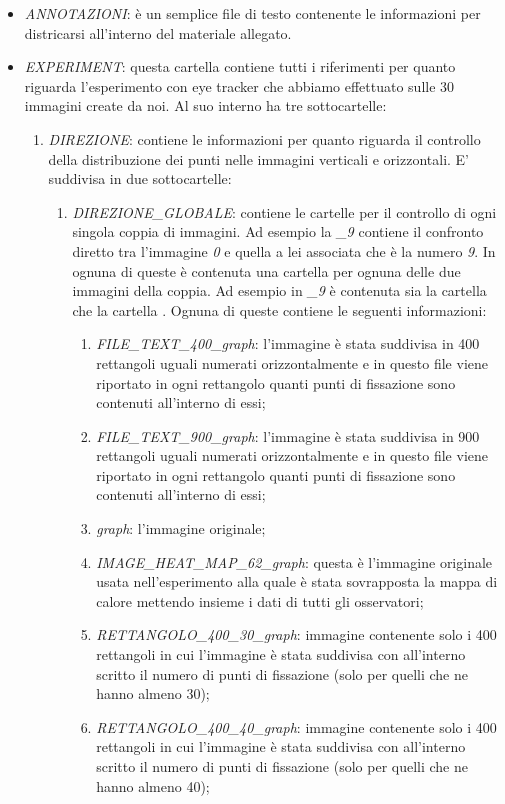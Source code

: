 \documentclass[%
	corpo=12pt,
    twoside,
    stile=classica,
    oldstyle,
    tipotesi=custom,
    greek,
    evenboxes,
]{toptesi}
\begin{document}
{\begin{itemize}
\item \textit{ANNOTAZIONI}: è un semplice file di testo contenente le informazioni per districarsi all'interno del materiale allegato.
\item \textit{EXPERIMENT}: questa cartella contiene tutti i riferimenti per quanto riguarda l’esperimento con eye tracker che abbiamo effettuato sulle 30 immagini create da noi. Al suo interno ha tre sottocartelle:
	\begin{enumerate}
	\item \textit{DIREZIONE}: contiene le informazioni per quanto riguarda il controllo della distribuzione dei punti nelle immagini verticali e orizzontali. E' suddivisa in due sottocartelle:
		\begin{enumerate}
		\item \textit{DIREZIONE\_GLOBALE}: contiene le cartelle per il controllo di ogni singola coppia di immagini. Ad esempio la \textit{\_9\”} contiene il confronto diretto tra l’immagine \textit{0} e quella a lei associata che è 		la numero \textit{9}. In ognuna di queste è contenuta una cartella per ognuna delle due immagini della coppia. Ad esempio in \textit{\_9\”} è contenuta sia la cartella \textit{\”} che la cartella \textit{\”}. Ognuna di queste contiene le seguenti 		informazioni:
			\begin{enumerate}
			\item \textit{FILE\_TEXT\_400\_graph}: l’immagine è stata suddivisa in 400 rettangoli uguali numerati orizzontalmente e in questo file viene riportato in ogni rettangolo quanti punti di fissazione sono contenuti all’interno di essi;
			\item \textit{FILE\_TEXT\_900\_graph}: l’immagine è stata suddivisa in 900 rettangoli uguali numerati orizzontalmente e in questo file viene riportato in ogni rettangolo quanti punti di fissazione sono contenuti all’interno di essi;
			\item \textit{graph}: l’immagine originale;
			\item \textit{IMAGE\_HEAT\_MAP\_62\_graph}: questa è l’immagine originale usata nell’esperimento alla quale è stata sovrapposta la mappa di calore mettendo insieme i dati di tutti gli osservatori;
			\item \textit{RETTANGOLO\_400\_30\_graph}: immagine contenente solo i 400 rettangoli in cui l’immagine è stata suddivisa con all’interno scritto il numero di punti di fissazione (solo per quelli che ne hanno almeno 30);
			\item \textit{RETTANGOLO\_400\_40\_graph}: immagine contenente solo i 400 rettangoli in cui l’immagine è stata suddivisa con all’interno scritto il numero di punti di fissazione (solo per quelli che ne hanno almeno 40);

\end{enumerate}
\end{enumerate}
\end{enumerate}
\end{itemize}}
\end{document}
